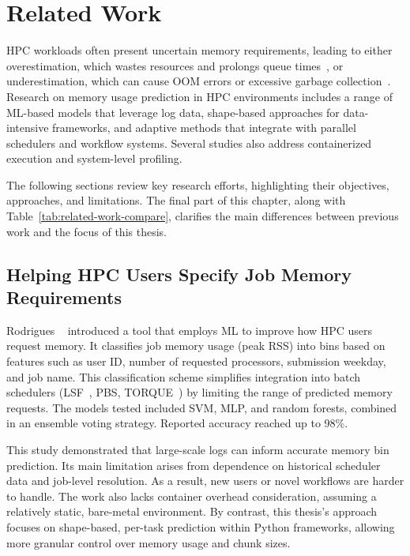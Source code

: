 \chapter{Related Work}
\label{ch:related-work}

\ac{HPC} workloads often present uncertain memory requirements, leading to either overestimation, which wastes resources and prolongs queue times~\cite{tanash2021ampro}, or underestimation, which can cause \ac{OOM} errors or excessive garbage collection~\cite{myung2021}.
Research on memory usage prediction in \ac{HPC} environments includes a range of \ac{ML}-based models that leverage log data, shape-based approaches for data-intensive frameworks, and adaptive methods that integrate with parallel schedulers and workflow systems.
Several studies also address containerized execution and system-level profiling.

The following sections review key research efforts, highlighting their objectives, approaches, and limitations.
The final part of this chapter, along with Table~\ref{tab:related-work-compare}, clarifies the main differences between previous work and the focus of this thesis.


\section{Helping HPC Users Specify Job Memory Requirements}
\label{sec:rw-helping-hpc-users}

Rodrigues \etal~\cite{rodrigues2016} introduced a tool that employs \ac{ML} to improve how \ac{HPC} users request memory.
It classifies job memory usage (peak \ac{RSS}) into bins based on features such as user ID, number of requested processors, submission weekday, and job name.
This classification scheme simplifies integration into batch schedulers (\ac{LSF}~\cite{ibm_spectrum_lsf_2020}, \ac{PBS}, \ac{TORQUE}~\cite{staples2006torque}) by limiting the range of predicted memory requests.
The models tested included \ac{SVM}, \ac{MLP}, and random forests, combined in an ensemble voting strategy.
Reported accuracy reached up to 98\%.

This study demonstrated that large-scale logs can inform accurate memory bin prediction.
Its main limitation arises from dependence on historical scheduler data and job-level resolution.
As a result, new users or novel workflows are harder to handle.
The work also lacks container overhead consideration, assuming a relatively static, bare-metal environment.
By contrast, this thesis's approach focuses on shape-based, per-task prediction within Python frameworks, allowing more granular control over memory usage and chunk sizes.


